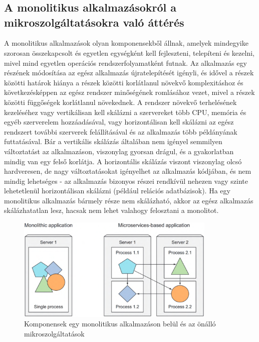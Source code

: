 \chapter{\docker}
\section{A monolitikus alkalmazásokról a mikroszolgáltatásokra való áttérés}
A monolitikus alkalmazások olyan komponensekből állnak, amelyek mindegyike szorosan
összekapcsolt és egyetlen egységként kell fejleszteni, telepíteni és kezelni, mivel mind egyetlen operációs rendszerfolyamatként futnak. Az alkalmazás egy részének módosítása az egész alkalmazás újratelepítését igényli, és idővel a részek közötti határok hiánya a részek közötti korlátlanul növekvő komplexitáshoz és következésképpen az egész rendszer minőségének romlásához vezet, mivel a részek közötti függőségek korlátlanul növekednek. A rendszer növekvő terhelésének kezeléséhez vagy vertikálisan kell skálázni a szervereket több CPU, memória és egyéb szerverelem hozzáadásával, vagy horizontálisan kell skálázni az egész rendszert további szerverek felállításával és az alkalmazás több példányának futtatásával. Bár a vertikális skálázás általában nem igényel semmilyen változtatást az alkalmazáson, viszonylag gyorsan drágul, és a gyakorlatban mindig van egy felső korlátja. A horizontális skálázás viszont viszonylag olcsó hardveresen, de nagy változtatásokat igényelhet az alkalmazás kódjában, és nem mindig lehetséges - az alkalmazás bizonyos részei rendkívül nehezen vagy szinte lehetetlenül horizontálisan skálázni (például relációs adatbázisok). Ha egy monolitikus alkalmazás bármely része nem skálázható, akkor az egész alkalmazás skálázhatatlan lesz, hacsak nem lehet valahogy felosztani a monolitot.

\begin{figure}[ht]
    \centering
         \includegraphics[width=0.85\textwidth]{figures/docker/monolithic-and-microservices.png}
          \caption{Komponensek egy monolitikus alkalmazáson belül és az önálló mikroszolgáltatások \cite{Marko17}}
           \label{monolithic-and-microservices}
\end{figure}


